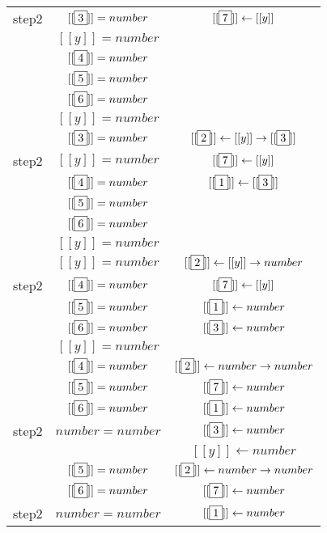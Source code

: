 \documentclass[letterpaper,11pt]{article}
\begin{document}
\begin{enumerate}
\begin{center}
\begin{longtable}{|c|c|c|}
             step2&$[[\fbox{3}]]=number$&$[[\fbox{7}]]\leftarrow[[y]]$\\
             &$[[y]]=number$&\\
             &$[[\fbox{4}]]=number$&\\
             &$[[\fbox{5}]]=number$&\\ 
             &$[[\fbox{6}]]=number$&\\ 
             &$[[y]]=number$&\\ 
             \hline
             &$[[\fbox{3}]]=number$&
             $[[\fbox{2}]]\leftarrow[[y]]\rightarrow [[\fbox{3}]]$\\
             step2&$[[y]]=number$&$[[\fbox{7}]]\leftarrow [[y]]$\\
             &$[[\fbox{4}]]=number$&$[[\fbox{1}]]\leftarrow [[\fbox{3}]]$\\
             &$[[\fbox{5}]]=number$&\\
             &$[[\fbox{6}]]=number$&\\ 
             &$[[y]]=number$&\\ 
             \hline
             &$[[y]]=number$&
             $[[\fbox{2}]]\leftarrow [[y]] \rightarrow number$\\
             step2&$[[\fbox{4}]]=number$&$[[\fbox{7}]]\leftarrow [[y]]$\\
             &$[[\fbox{5}]]=number$&$[[\fbox{1}]]\leftarrow number$\\
             &$[[\fbox{6}]]=number$&$[[\fbox{3}]]\leftarrow number$\\
             &$[[y]]=number$&\\
             \hline
             &$[[\fbox{4}]]=number$&
             $[[\fbox{2}]] \leftarrow number \rightarrow number$\\
             &$[[\fbox{5}]]=number$&
             $[[\fbox{7}]]\leftarrow number$\\
             &$[[\fbox{6}]]=number$&
             $[[\fbox{1}]]\leftarrow number$\\
             step2&$number=number$&$[[\fbox{3}]]\leftarrow number$\\
             &&$[[y]]\leftarrow number$\\
            \hline
            &$[[\fbox{5}]]=number$&$[[\fbox{2}]] \leftarrow number \rightarrow number$ \\
            &$[[\fbox{6}]]=number$&$[[\fbox{7}]] \leftarrow number$\\
            step2&$number=number$&$[[\fbox{1}]] \leftarrow number$ \\

\end{longtable}
\end{center}
\end{enumerate}
\end{document}
